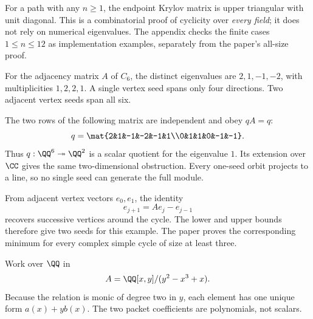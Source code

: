 For a path with any $n\ge1$, the endpoint Krylov matrix is upper triangular with unit diagonal. This is a combinatorial proof of cyclicity over \emph{every field}; it does not rely on numerical eigenvalues. The appendix checks the finite cases $1\le n\le12$ as implementation examples, separately from the paper's all-size proof.


For the adjacency matrix $A$ of $C_6$, the distinct eigenvalues are $2,1,-1,-2$, with multiplicities $1,2,2,1$. A single vertex seed spans only four directions. Two adjacent vertex seeds span all six.


The two rows of the following matrix are independent and obey $qA=q$:
\[
q=\mat{2&1&-1&-2&-1&1\\0&1&1&0&-1&-1}.
\]
Thus $q:\QQ^6\twoheadrightarrow\QQ^2$ is a scalar quotient for the eigenvalue $1$. Its extension over $\CC$ gives the same two-dimensional obstruction. Every one-seed orbit projects to a line, so no single seed can generate the full module.

From adjacent vertex vectors $e_0,e_1$, the identity
\[
e_{j+1}=Ae_j-e_{j-1}
\]
recovers successive vertices around the cycle. The lower and upper bounds therefore give two seeds for this example. The paper proves the corresponding minimum for every complex simple cycle of size at least three.


Work over $\QQ$ in
\[
A=\QQ[x,y]/(y^2-x^3+x).
\]
Because the relation is monic of degree two in $y$, each element has one unique form $a(x)+yb(x)$. The two packet coefficients are polynomials, not scalars.

